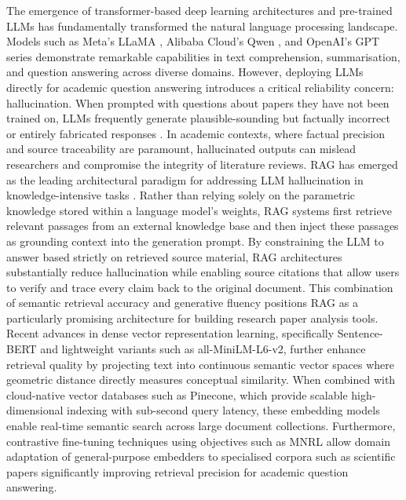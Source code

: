 \newline \newline The emergence of transformer-based deep learning architectures \citep{vaswani2017attention} and pre-trained LLMs has fundamentally transformed the natural language processing landscape. Models such as Meta's LLaMA \citep{touvron2023llama}, Alibaba Cloud's Qwen \citep{yang2024qwen2}, and OpenAI's GPT series demonstrate remarkable capabilities in text comprehension, summarisation, and question answering across diverse domains. However, deploying LLMs directly for academic question answering introduces a critical reliability concern: hallucination. When prompted with questions about papers they have not been trained on, LLMs frequently generate plausible-sounding but factually incorrect or entirely fabricated responses \citep{ji2023survey}. In academic contexts, where factual precision and source traceability are paramount, hallucinated outputs can mislead researchers and compromise the integrity of literature reviews.
\newline \newline RAG has emerged as the leading architectural paradigm for addressing LLM hallucination in knowledge-intensive tasks \citep{lewis2020retrieval}. Rather than relying solely on the parametric knowledge stored within a language model's weights, RAG systems first retrieve relevant passages from an external knowledge base and then inject these passages as grounding context into the generation prompt. By constraining the LLM to answer based strictly on retrieved source material, RAG architectures substantially reduce hallucination while enabling source citations that allow users to verify and trace every claim back to the original document. This combination of semantic retrieval accuracy and generative fluency positions RAG as a particularly promising architecture for building research paper analysis tools.
\newline \newline Recent advances in dense vector representation learning, specifically Sentence-BERT \citep{reimers2019sentence} and lightweight variants such as all-MiniLM-L6-v2, further enhance retrieval quality by projecting text into continuous semantic vector spaces where geometric distance directly measures conceptual similarity. When combined with cloud-native vector databases such as Pinecone, which provide scalable high-dimensional indexing with sub-second query latency, these embedding models enable real-time semantic search across large document collections. Furthermore, contrastive fine-tuning techniques using objectives such as MNRL \citep{henderson2017efficient} allow domain adaptation of general-purpose embedders to specialised corpora such as scientific papers significantly improving retrieval precision for academic question answering.
